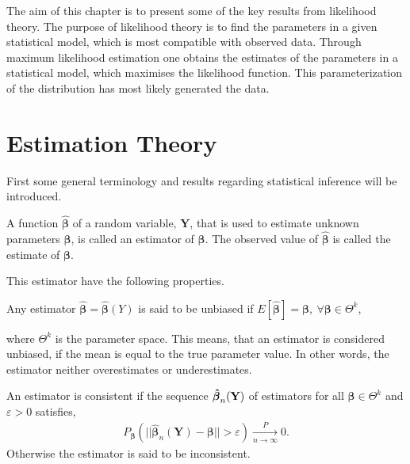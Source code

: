 The aim of this chapter is to present some of the key results from likelihood theory. 
The purpose of likelihood theory is to find the parameters in a given statistical model, which is most compatible with observed data. 
Through maximum likelihood estimation one obtains the estimates of the parameters in a statistical model, which maximises the likelihood function. 
This parameterization of the distribution has most likely generated the data.

\section{Estimation Theory}

First some general terminology and results regarding statistical inference will be introduced.

\begin{definition} 
    A function $\boldsymbol{\hat{\beta}}$ of a random variable, $\textbf{Y}$, that is used to estimate unknown parameters $\boldsymbol{\beta}$, is called an estimator of $\boldsymbol{\beta}$. The observed value of $\boldsymbol{\hat{\beta}}$ is called the estimate of $\boldsymbol{\beta}$.
\end{definition}

This estimator have the following properties. 

\begin{definition}
\label{def:Unbiased_estmator}
Any estimator $\boldsymbol{\hat{\beta}} = \boldsymbol{\hat{\beta}}(Y)$ is said to be unbiased if $E[\boldsymbol{\hat{\beta}}] = \boldsymbol{\beta}, \ \forall \boldsymbol{\beta} \in \Theta^k$,
\end{definition}

where $\Theta^k$ is the parameter space. This means, that an estimator is considered unbiased, if the mean is equal to the true parameter value. 
In other words, the estimator neither overestimates or underestimates.

\begin{definition} 
\label{def:consistent_estimator}
An estimator is consistent if the sequence $\operatorname{\boldsymbol{\hat{\beta}}}_n(\textbf{Y})$ of estimators for all $\boldsymbol{\beta} \in \Theta^k$ and $\varepsilon > 0$ satisfies,
\begin{align*}
    P_{\boldsymbol{\beta}}(||\hat{\boldsymbol{\beta}}_n(\textbf{Y}) - \boldsymbol{\beta}|| > \varepsilon) \xrightarrow[n \rightarrow \infty]{P} 0.
\end{align*}
Otherwise the estimator is said to be inconsistent.
\end{definition}

